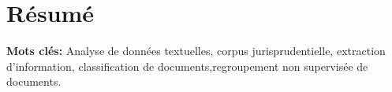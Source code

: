 \chapter*{Résumé}

\textbf{Mots clés:} Analyse de données textuelles, corpus jurisprudentielle, extraction d'information, classification de documents,regroupement non supervisée de documents.
